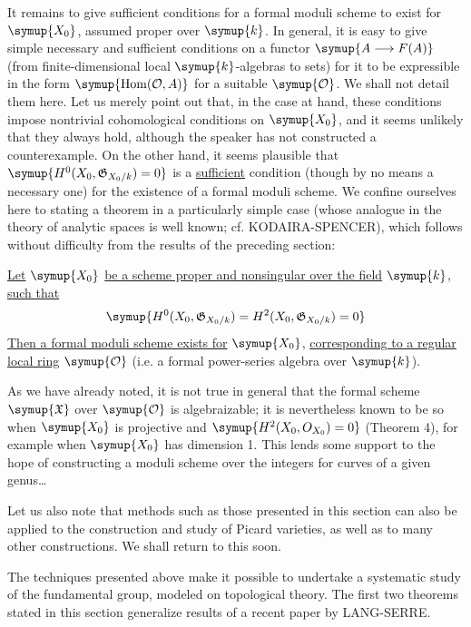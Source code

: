 It remains to give sufficient conditions for a formal moduli scheme to exist
for $\symup{X_0}$, assumed proper over $\symup{k}$. In general, it is easy to give simple
necessary and sufficient conditions on a functor $\symup{A\longrightarrow F(A)}$ (from
finite-dimensional local $\symup{k}$-algebras to sets) for it to be expressible in the
form $\symup{\operatorname{Hom}(\mathcal O,A)}$ for a suitable $\symup{\mathcal O}$. We shall
not detail them here. Let us merely point out that, in the case at hand, these
conditions impose nontrivial cohomological conditions on $\symup{X_0}$, and it seems
unlikely that they always hold, although the speaker has not constructed a
counterexample. On the other hand, it seems plausible that
$\symup{H^0(X_0,\mathfrak G_{X_0/k})=0}$ is a \uline{sufficient} condition (though by no means a
necessary one) for the existence of a formal moduli scheme. We confine
ourselves here to stating a theorem in a particularly simple case (whose
analogue in the theory of analytic spaces is well known; cf.
KODAIRA-SPENCER), which follows without difficulty from the results of the
preceding section:

 \uline{Let} $\symup{X_0}$ \uline{be a scheme proper and nonsingular over the
field} $\symup{k}$, \uline{such that}
\[
  \symup{H^0(X_0,\mathfrak G_{X_0/k})=H^2(X_0,\mathfrak G_{X_0/k})=0}
\]
\uline{Then a formal moduli scheme exists for} $\symup{X_0}$, \uline{corresponding to a regular local
ring} $\symup{\mathcal O}$ (i.e. a formal power-series algebra over $\symup{k}$).

As we have already noted, it is not true in general that the formal scheme
$\symup{\mathfrak X}$ over $\symup{\mathcal O}$ is algebraizable; it is nevertheless known to
be so when $\symup{X_0}$ is projective and $\symup{H^2(X_0,O_{X_0})=0}$ (Theorem 4), for
example when $\symup{X_0}$ has dimension 1. This lends some support to the hope of
constructing a moduli scheme over the integers for curves of a given
genus\ldots{}

Let us also note that methods such as those presented in this section can also be applied to the
construction and study of Picard varieties, as well as to many other
constructions. We shall return to this soon.


The techniques presented above make it possible to undertake a systematic
study of the fundamental group, modeled on topological theory. The first two
theorems stated in this section generalize results of a recent paper by
LANG-SERRE.

